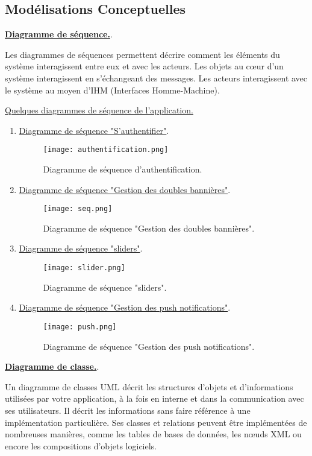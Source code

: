 \subsection{Modélisations Conceptuelles}

\textbf{\underline{Diagramme de séquence.}}.

Les diagrammes de séquences permettent décrire comment les éléments du système interagissent entre eux et avec les acteurs. Les objets au cœur d’un système interagissent en s’échangeant des messages. Les acteurs interagissent avec le système au moyen d’IHM (Interfaces Homme-Machine).

\underline{Quelques diagrammes de séquence de l’application.}

\begin{enumerate}
	\item  \underline{Diagramme de séquence "S'authentifier"}.
\begin{figure}[H]
	\centering
	\texttt{[image: authentification.png]}
	\caption{Diagramme de séquence d'authentification.}
	\label{fig:sp0}
\end{figure}

\item  \underline{Diagramme de séquence "Gestion des doubles bannières"}.
\begin{figure}[H]
	\centering
	\texttt{[image: seq.png]}
	\caption{Diagramme de séquence "Gestion des doubles bannières".}
	\label{fig:sp0}
\end{figure}

\item  \underline{Diagramme de séquence "sliders"}.
\begin{figure}[H]
	\centering
	\texttt{[image: slider.png]}
	\caption{Diagramme de séquence "sliders".}
	\label{fig:sp0}
\end{figure}

\item  \underline{Diagramme de séquence "Gestion des push notifications"}.
\begin{figure}[H]
	\centering
	\texttt{[image: push.png]}
	\caption{Diagramme de séquence "Gestion des push notifications".}
	\label{fig:sp0}
\end{figure}
\end{enumerate}

\textbf{\underline{Diagramme de classe.}}.

Un diagramme de classes UML décrit les structures d’objets et d’informations utilisées par votre application, à la fois en interne et dans la communication avec ses utilisateurs. Il décrit les informations sans faire référence à une implémentation particulière. Ses classes et relations peuvent être implémentées de nombreuses manières, comme les tables de bases de données, les nœuds XML ou encore les compositions d’objets logiciels.

